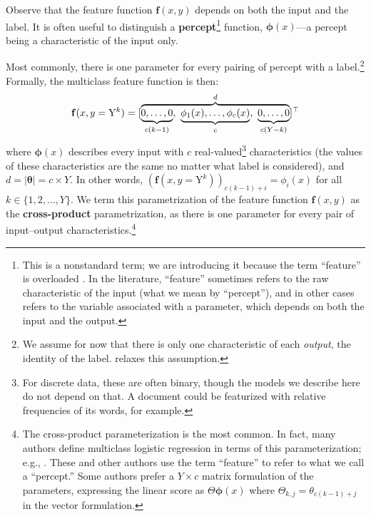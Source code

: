 \documentclass[11pt,letterpaper]{article}
\newcommand{\ensuretext}[1]{#1}
\newcommand{\nssmarker}{\ensuretext{\textcolor{magenta}{\ensuremath{^{\textsc{NS}}_{\textsc{S}}}}}}
\newcommand{\arkcomment}[3]{\ensuretext{\textcolor{#3}{[#1 #2]}}}
\newcommand{\nss}[1]{\arkcomment{\nssmarker}{#1}{magenta}}
\begin{document}
Observe that the feature function $\mathbf{f}(x,y)$ depends on both the input and the label.
It is often useful to distinguish a {\bf percept}\footnote{This is a nonstandard term; we are introducing 
it because the term ``feature'' is overloaded \citep[p.~591]{manning-99}. 
In the literature, ``feature'' sometimes refers to the raw characteristic of the input (what we mean by ``percept''),
and in other cases refers to the variable associated with a parameter, 
which depends on both the input and the output.} function, 
$\boldsymbol{\phi}(x)$---a percept being a characteristic of the input only.

Most commonly, there is one parameter for every pairing of percept with a label.\footnote{We assume 
for now that there is only one characteristic of each {\em output}, the identity of the label.  relaxes this assumption.}
Formally, the multiclass feature function is then:
\begin{equation}\label{eq:crossprod}
\mathbf{f}(x,y=\mathrm{Y}^k) = [\overbrace{\underbrace{0, \ldots, 0\vphantom{\phi}}_{c(k-1)},\ \underbrace{\phi_1(x), \ldots, \phi_c(x)}_{c\vphantom{(}},\ \underbrace{0, \ldots, 0\vphantom{\phi}}_{c(Y-k)}}^d]^{\top}
\end{equation}
where $\boldsymbol{\phi}(x)$ describes every input with $c$ real-valued\footnote{For discrete data, these are often binary, though the models we describe here do not depend on that. A document could be featurized with relative frequencies of its words, for example.} 
characteristics (the values of these characteristics are the same no matter what label is considered), 
and $d = |\boldsymbol{\theta}| = c \times Y$.
In other words, $\left(\mathbf{f}(x,y=\mathrm{Y}^k)\right)_{c(k-1)+i} = \phi_i(x)$ for all $k\in\{1,2,\ldots,Y\}$.
We term this parametrization of the feature function $\mathbf{f}(x,y)$ as the {\bf cross-product}
parametrization, as there is one parameter for every pair of input--output characteristics.\footnote{The cross-product parameterization is the most common. 
In fact, many authors define multiclass logistic regression in terms of this parameterization; e.g., \citet{hastie-09}. 
These and other authors use the term ``feature'' to refer to what we call a ``percept.''
Some authors prefer a $Y \times c$ matrix formulation of the parameters, expressing the linear score as $\Theta \boldsymbol{\phi}(x)$ 
where $\Theta_{k,j}=\theta_{c(k-1)+j}$ in the vector formulation.}
\end{document}
